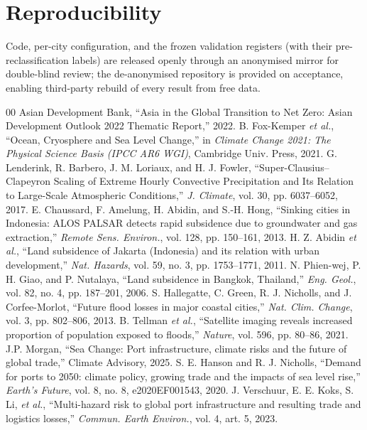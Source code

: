 \documentclass[conference]{IEEEtran}
\begin{document}
\section*{Reproducibility}
Code, per-city configuration, and the frozen validation registers (with their pre-reclassification labels) are released openly through an anonymised mirror for double-blind review; the de-anonymised repository is provided on acceptance, enabling third-party rebuild of every result from free data.

\begin{thebibliography}{00}
 Asian Development Bank, ``Asia in the Global Transition to Net Zero: Asian Development Outlook 2022 Thematic Report,'' 2022.
 B. Fox-Kemper \emph{et al.}, ``Ocean, Cryosphere and Sea Level Change,'' in \emph{Climate Change 2021: The Physical Science Basis (IPCC AR6 WGI)}, Cambridge Univ. Press, 2021.
 G. Lenderink, R. Barbero, J. M. Loriaux, and H. J. Fowler, ``Super-Clausius--Clapeyron Scaling of Extreme Hourly Convective Precipitation and Its Relation to Large-Scale Atmospheric Conditions,'' \emph{J. Climate}, vol. 30, pp. 6037--6052, 2017.
 E. Chaussard, F. Amelung, H. Abidin, and S.-H. Hong, ``Sinking cities in Indonesia: ALOS PALSAR detects rapid subsidence due to groundwater and gas extraction,'' \emph{Remote Sens. Environ.}, vol. 128, pp. 150--161, 2013.
 H. Z. Abidin \emph{et al.}, ``Land subsidence of Jakarta (Indonesia) and its relation with urban development,'' \emph{Nat. Hazards}, vol. 59, no. 3, pp. 1753--1771, 2011.
 N. Phien-wej, P. H. Giao, and P. Nutalaya, ``Land subsidence in Bangkok, Thailand,'' \emph{Eng. Geol.}, vol. 82, no. 4, pp. 187--201, 2006.
 S. Hallegatte, C. Green, R. J. Nicholls, and J. Corfee-Morlot, ``Future flood losses in major coastal cities,'' \emph{Nat. Clim. Change}, vol. 3, pp. 802--806, 2013.
 B. Tellman \emph{et al.}, ``Satellite imaging reveals increased proportion of population exposed to floods,'' \emph{Nature}, vol. 596, pp. 80--86, 2021.
 J.P. Morgan, ``Sea Change: Port infrastructure, climate risks and the future of global trade,'' Climate Advisory, 2025.
 S. E. Hanson and R. J. Nicholls, ``Demand for ports to 2050: climate policy, growing trade and the impacts of sea level rise,'' \emph{Earth's Future}, vol. 8, no. 8, e2020EF001543, 2020.
 J. Verschuur, E. E. Koks, S. Li, \emph{et al.}, ``Multi-hazard risk to global port infrastructure and resulting trade and logistics losses,'' \emph{Commun. Earth Environ.}, vol. 4, art. 5, 2023.

\end{thebibliography}
\end{document}
